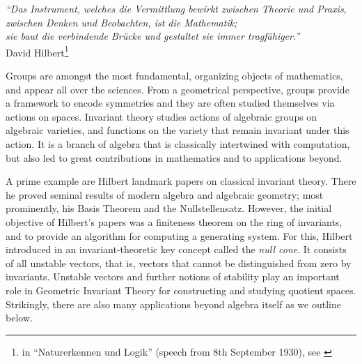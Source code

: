 


\begin{center}
	\emph{``Das Instrument, welches die Vermittlung bewirkt zwischen Theorie und Praxis, zwischen Denken und Beobachten, ist die Mathematik;\\sie baut die verbindende Brücke und gestaltet sie immer tragfähiger.''}
	\\ \bigskip
	David Hilbert\footnote{in ``Naturerkennen und Logik'' (speech from 8th September 1930), see \cite[p.~385]{HilbertGesammelte}}
\end{center}

\vspace{0.5cm}

Groups are amongst the most fundamental, organizing objects of mathematics, and appear all over the sciences. From a geometrical perspective, groups provide a framework to encode symmetries and they are often studied themselves via actions on spaces. %
Invariant theory studies actions of algebraic groups on algebraic varieties, and functions on the variety that remain invariant under this action. It is a branch of algebra that is classically intertwined with computation, but also led to great contributions in mathematics and to applications beyond.

A prime example are Hilbert landmark papers \cite{Hilbert1890, Hilbert1893} on classical invariant theory. There he proved seminal results of modern algebra and algebraic geometry; most prominently, his Basis Theorem and the Nullstellensatz. However, the initial objective of Hilbert's papers was a finiteness theorem on the ring of invariants, and to provide an algorithm for computing a generating system. For this, Hilbert introduced in \cite{Hilbert1893} an invariant-theoretic key concept called the \emph{null cone}. It consists of all unstable vectors, that is, vectors that cannot be distinguished from zero by invariants. Unstable vectors and further notions of stability play an important role in Geometric Invariant Theory \cite{MumfordGITbook} for constructing and studying quotient spaces. Strikingly, there are also many applications beyond algebra itself as we outline below.

